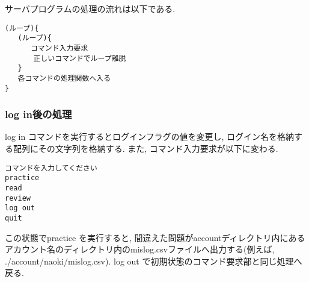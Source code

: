 \documentclass[a4j]{jarticle}
\begin{document}
サーバプログラムの処理の流れは以下である.
\begin{verbatim}
(ループ){
   (ループ){
      コマンド入力要求
　　　　正しいコマンドでループ離脱
   }
   各コマンドの処理関数へ入る
}
\end{verbatim}


\subsubsection{log in後の処理}
log in コマンドを実行するとログインフラグの値を変更し, ログイン名を格納する配列にその文字列を格納する. 
また, コマンド入力要求が以下に変わる.
\begin{verbatim}
コマンドを入力してください
practice
read
review
log out
quit
\end{verbatim}
この状態でpractice を実行すると, 間違えた問題がaccountディレクトリ内にあるアカウント名のディレクトリ内のmislog.csvファイルへ出力する(例えば, ./account/naoki/mislog.csv). 
log out で初期状態のコマンド要求部と同じ処理へ戻る.
\end{document}
